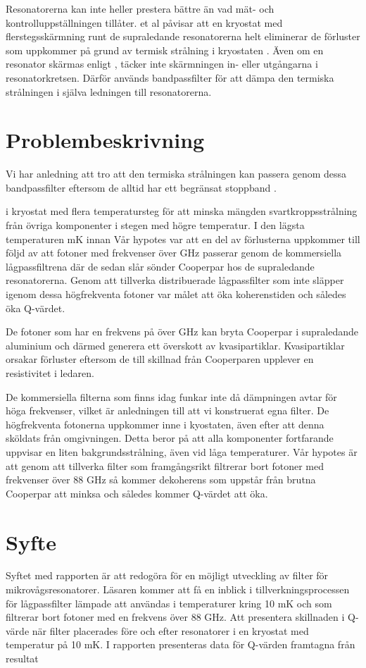\documentclass[main.tex]{subfiles}
\begin{document}
Resonatorerna kan inte heller prestera bättre än vad mät- och kontrolluppställningen tillåter. \citeauthor{Barends2011} et al påvisar att en kryostat med flerstegsskärmning runt de supraledande resonatorerna helt eliminerar de förluster som uppkommer på grund av termisk strålning i kryostaten \cite{Barends2011}. Även om en resonator skärmas enligt \cite{Barends2011}, täcker inte skärmningen in- eller utgångarna i resonatorkretsen. Därför används bandpassfilter för att dämpa den termiska strålningen i själva ledningen till resonatorerna.

\section{Problembeskrivning}
Vi har anledning att tro att den termiska strålningen kan passera genom dessa bandpassfilter eftersom de alltid har ett begränsat stoppband \cite{santavicca2008}.


i kryostat med flera temperatursteg för att minska mängden svartkroppsstrålning från övriga komponenter i stegen med högre temperatur. I den lägsta temperaturen \unit[10]{mK} innan 
Vår hypotes var att en del av förlusterna uppkommer till följd av att fotoner med frekvenser över \unit[88]{GHz} passerar genom de kommersiella lågpassfiltrena där de sedan slår sönder Cooperpar hos de supraledande resonatorerna. Genom att tillverka distribuerade lågpassfilter som inte släpper igenom dessa högfrekventa fotoner var målet att öka koherenstiden och således öka Q-värdet.


De fotoner som har en frekvens på över \unit[88]{GHz} kan bryta Cooperpar i supraledande aluminium och därmed generera ett överskott av kvasipartiklar. Kvasipartiklar orsakar förluster eftersom de till skillnad från Cooperparen upplever en resistivitet i ledaren. 

De kommersiella filterna som finns idag funkar inte då dämpningen avtar för höga frekvenser, vilket är anledningen till att vi konstruerat egna filter. De högfrekventa fotonerna uppkommer inne i kyostaten, även efter att denna sköldats från omgivningen. Detta beror på att alla komponenter fortfarande uppvisar en liten bakgrundsstrålning, även vid låga temperaturer. Vår hypotes är att genom att tillverka filter som framgångsrikt filtrerar bort fotoner med frekvenser över 88 GHz så kommer dekoherens som uppstår från brutna Cooperpar att minksa och således kommer Q-värdet att öka.

\section{Syfte}
Syftet med rapporten är att redogöra för en möjligt utveckling av filter för mikrovågsresonatorer. Läsaren kommer att få en inblick i tillverkningsprocessen för lågpassfilter lämpade att användas i temperaturer kring 10 mK och som filtrerar bort fotoner med en frekvens över 88 GHz. Att presentera skillnaden i Q-värde när filter placerades före och efter resonatorer i en kryostat med temperatur på 10 mK. I rapporten presenteras data för Q-värden framtagna från resultat
\end{document}

